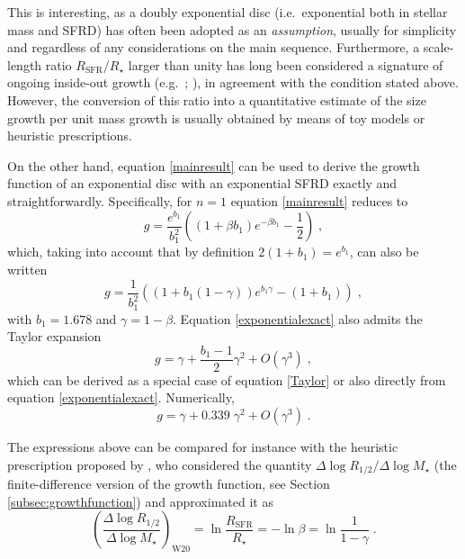\documentclass[fleqn,usenatbib]{mnras}
\begin{document}
This is interesting, as a doubly exponential disc (i.e.\ exponential both in stellar mass and SFRD) has often been adopted as an \emph{assumption}, usually for simplicity and regardless of any considerations on the main sequence. Furthermore, a scale-length ratio $R_\textrm{SFR} / R_\star$ larger than unity has long been considered a signature of ongoing inside-out growth (e.g.\ \citealt{MM07}; \citealt{Wilman+20}), in agreement with the condition stated above. However, the conversion of this ratio into a quantitative estimate of the size growth per unit mass growth is usually obtained by means of toy models or heuristic prescriptions.

On the other hand, equation \eqref{mainresult} can be used to derive the growth function of an exponential disc with an exponential SFRD exactly and straightforwardly. Specifically, for $n=1$ equation \eqref{mainresult} reduces to
\begin{equation}\label{exponentialcase}
g =  \frac{e^{b_1}}{b_1^2} \left( (1+\beta b_1)e^{-\beta b_1} - \frac{1}{2} \right) \; ,
\end{equation}
which, taking into account that by definition $2(1+b_1) = e^{b_1}$, can also be written
\begin{equation}\label{exponentialexact}
g = \frac{1}{b_1^2} \left( (1+b_1(1-\gamma))e^{b_1 \gamma} - (1+b_1) \right) \;,
\end{equation}
with $b_1 = 1.678$ and $\gamma = 1-\beta$. Equation \eqref{exponentialexact} also admits the Taylor expansion
\begin{equation}
g = \gamma + \frac{b_1-1}{2} \gamma^2 + O(\gamma^3) \;,
\end{equation}
which can be derived as a special case of equation \eqref{Taylor} or also directly from equation \eqref{exponentialexact}. Numerically, \begin{equation}\label{exponentialTaylor}
g = \gamma + 0.339 \; \gamma^2 + O(\gamma^3) \;.
\end{equation}

The expressions above can be compared for instance with the heuristic prescription proposed by \cite{Wilman+20}, who considered the quantity $\Delta \log R_{1/2}/\Delta \log M_\star$ (the finite-difference version of the growth function, see Section \ref{subsec:growthfunction}) and approximated it as
\begin{equation}\label{W20}
\left( \frac{\Delta \log R_{1/2}}{\Delta \log M_\star} \right)_\textrm{W20} = \ln \frac{R_\textrm{SFR}}{R_\star} = - \ln \beta = \ln \frac{1}{1-\gamma} \;.
\end{equation}
\end{document}
